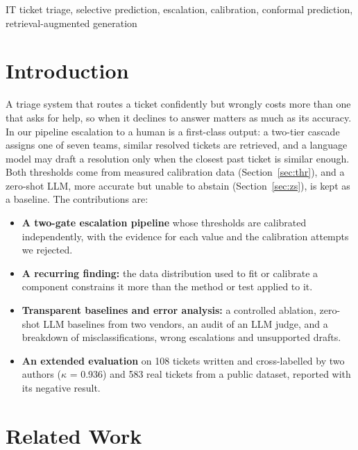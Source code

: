 \documentclass[conference,a4paper]{IEEEtran}
\begin{document}
\begin{IEEEkeywords}
IT ticket triage, selective prediction, escalation, calibration, conformal prediction, retrieval-augmented generation
\end{IEEEkeywords}

\section{Introduction}\label{sec:intro}

A triage system that routes a ticket confidently but wrongly costs more than one that asks for help, so when it declines to answer matters as much as its accuracy. In our pipeline escalation to a human is a first-class output: a two-tier cascade assigns one of seven teams, similar resolved tickets are retrieved, and a language model may draft a resolution only when the closest past ticket is similar enough. Both thresholds come from measured calibration data (Section~\ref{sec:thr}), and a zero-shot LLM, more accurate but unable to abstain (Section~\ref{sec:zs}), is kept as a baseline. The contributions are:

\begin{itemize}
\item \textbf{A two-gate escalation pipeline} whose thresholds are calibrated independently, with the evidence for each value and the calibration attempts we rejected.
\item \textbf{A recurring finding:} the data distribution used to fit or calibrate a component constrains it more than the method or test applied to it.
\item \textbf{Transparent baselines and error analysis:} a controlled ablation, zero-shot LLM baselines from two vendors, an audit of an LLM judge, and a breakdown of misclassifications, wrong escalations and unsupported drafts.
\item \textbf{An extended evaluation} on 108 tickets written and cross-labelled by two authors ($\kappa$ = 0.936) and 583 real tickets from a public dataset, reported with its negative result.
\end{itemize}

\section{Related Work}\label{sec:rw}
\end{document}
